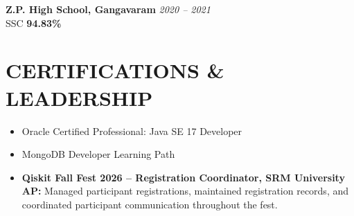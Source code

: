 \documentclass[a4paper,10pt]{article}
\begin{document}
\textbf{Z.P. High School, Gangavaram}
\hfill
\textit{2020 -- 2021}\\
SSC
\hfill
\textbf{94.83\%}

\section*{CERTIFICATIONS \& LEADERSHIP}

\begin{itemize}
    \item Oracle Certified Professional: Java SE 17 Developer
    \item MongoDB Developer Learning Path
    \item \textbf{Qiskit Fall Fest 2026 -- Registration Coordinator, SRM University AP:} Managed participant registrations, maintained registration records, and coordinated participant communication throughout the fest.
\end{itemize}
\end{document}
